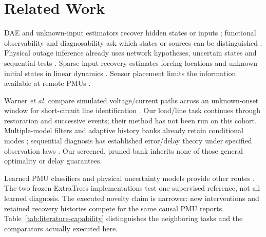 \section{Related Work}
\label{sec:narrative-related}

DAE and unknown-input estimators recover hidden states or inputs
\cite{gillijns2007input,nugroho2022dae,katanic2024recursive}; functional
observability and diagnosability ask which states or sources can be
distinguished \cite{fernando2010functional,montanari2022functional,
eriksson2013diagnosability,scharf1994matched}. Physical outage inference
already uses network hypotheses, uncertain states and sequential tests
\cite{tate2008outage,zhao2014outages,chen2016quickest,
rovatsos2017outage}. Sparse input recovery estimates forcing locations
and unknown initial states in linear dynamics \cite{anguluri2023group}.
Sensor placement limits the information available at remote PMUs
\cite{jamei2020limits,conte2023fault,yildiz2025sparse}.

Warner \emph{et al.} compare simulated voltage/current paths across an
unknown-onset window for short-circuit line identification
\cite{warner2023highfidelity}. Our load/line task continues through
restoration and successive events; their method has not been run on this
cohort. Multiple-model filters and adaptive history banks already retain
conditional modes \cite{blom1988imm,boers2005m3h}; sequential diagnosis
has established error/delay theory under specified observation laws
\cite{warner2024matrix}. Our screened, pruned bank inherits none of those
general optimality or delay guarantees.

Learned PMU classifiers and physical uncertainty models provide other
routes \cite{pandey2020realtime,li2024knowledge,yildiz2024few,
ensaf2023kernel,tartakovsky2023gp,albustami2026dae,nagi2022trajectory}.
The two frozen ExtraTrees implementations test one supervised reference,
not all learned diagnosis. The executed novelty claim is narrower: new
interventions and retained recovery histories compete for the same causal
PMU reports. Table~\ref{tab:literature-capability} distinguishes the
neighboring tasks and the comparators actually executed here.

